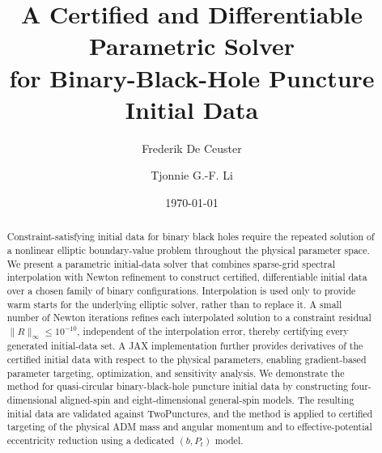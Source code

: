 \documentclass[
  aps,
  prd,
  twocolumn,
  amsmath,
  amssymb,
  nofootinbib,
  superscriptaddress,
  floatfix,
]{revtex4-2}
\begin{document}
\title{A Certified and Differentiable Parametric Solver \\ for Binary-Black-Hole Puncture Initial Data}

\author{Frederik De Ceuster}

\author{Tjonnie G.-F. Li}

\date{\today}

\begin{abstract}
Constraint-satisfying initial data for binary black holes require the repeated solution of a nonlinear elliptic boundary-value problem throughout the physical parameter space.
We present a parametric initial-data solver that combines sparse-grid spectral interpolation with Newton refinement to construct certified, differentiable initial data over a chosen family of binary configurations.
Interpolation is used only to provide warm starts for the underlying elliptic solver, rather than to replace it.
A small number of Newton iterations refines each interpolated solution to a constraint residual $\|R\|_\infty\le10^{-10}$, independent of the interpolation error, thereby certifying every generated initial-data set.
A JAX implementation further provides derivatives of the certified initial data with respect to the physical parameters, enabling gradient-based parameter targeting, optimization, and sensitivity analysis.
We demonstrate the method for quasi-circular binary-black-hole puncture initial data by constructing four-dimensional aligned-spin and eight-dimensional general-spin models.
The resulting initial data are validated against TwoPunctures, and the method is applied to certified targeting of the physical ADM mass and angular momentum and to effective-potential eccentricity reduction using a dedicated $(b,P_t)$ model.
\end{abstract}
\end{document}
